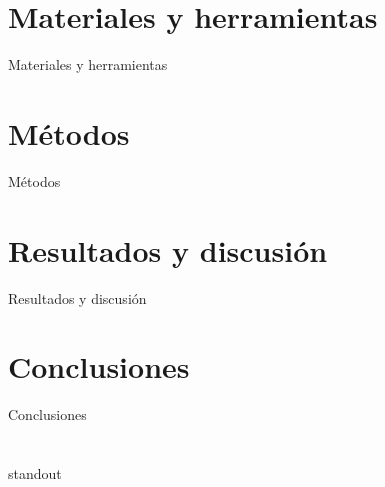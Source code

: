 \documentclass[spanish,a4paper]{beamer}%
\makeatletter
\def\beamer@writeslidentry@miniframesoff{%
  \expandafter\beamer@ifempty\expandafter{\beamer@framestartpage}{}%
  {%
    \clearpage\beamer@notesactions%
  }
}
\newcommand*{\miniframesoff}{\let\beamer@writeslidentry=\beamer@writeslidentry@miniframesoff}
\makeatother
\begin{document}
	\section{Materiales y herramientas}
	\begin{frame}{Materiales y herramientas}
		
	\end{frame}

	\section{Métodos}
	\begin{frame}{Métodos}
		
	\end{frame}

	\section{Resultados y discusión}
	\begin{frame}{Resultados y discusión}

	\end{frame}

	\section{Conclusiones}
	\begin{frame}{Conclusiones}
		
	\end{frame}

	\miniframesoff
	\section{}
	\begin{frame}{standout}	

	\end{frame}
\end{document}
